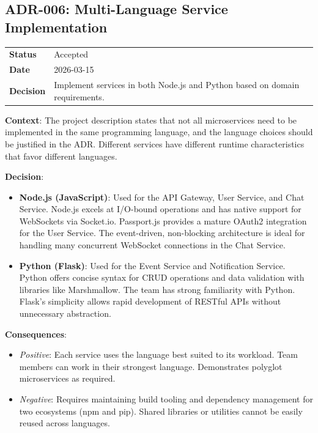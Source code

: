 \subsection{ADR-006: Multi-Language Service Implementation}

\begin{tabular}{p{3cm}p{10cm}}
\textbf{Status} & Accepted \\
\textbf{Date} & 2026-03-15 \\
\textbf{Decision} & Implement services in both Node.js and Python based on domain requirements. \\
\end{tabular}

\textbf{Context}: The project description states that not all microservices need to be implemented in the same programming language, and the language choices should be justified in the ADR. Different services have different runtime characteristics that favor different languages.

\textbf{Decision}:
\begin{itemize}
    \item \textbf{Node.js (JavaScript)}: Used for the API Gateway, User Service, and Chat Service. Node.js excels at I/O-bound operations and has native support for WebSockets via Socket.io. Passport.js provides a mature OAuth2 integration for the User Service. The event-driven, non-blocking architecture is ideal for handling many concurrent WebSocket connections in the Chat Service.
    \item \textbf{Python (Flask)}: Used for the Event Service and Notification Service. Python offers concise syntax for CRUD operations and data validation with libraries like Marshmallow. The team has strong familiarity with Python. Flask's simplicity allows rapid development of RESTful APIs without unnecessary abstraction.
\end{itemize}

\textbf{Consequences}:
\begin{itemize}
    \item \textit{Positive}: Each service uses the language best suited to its workload. Team members can work in their strongest language. Demonstrates polyglot microservices as required.
    \item \textit{Negative}: Requires maintaining build tooling and dependency management for two ecosystems (npm and pip). Shared libraries or utilities cannot be easily reused across languages.
\end{itemize}
